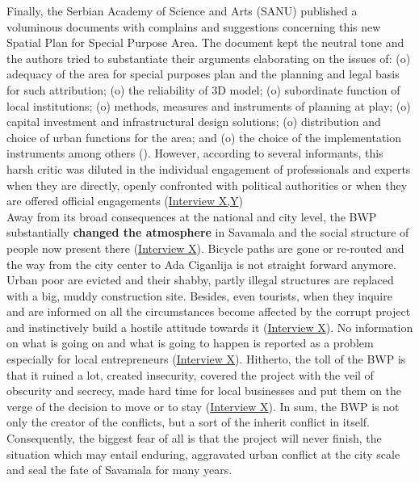 \documentclass[11pt]{report}
\begin{document}
Finally, the Serbian Academy of Science and Arts (SANU) published a voluminous documents with complains and suggestions concerning this new Spatial Plan for Special Purpose Area.
The document kept the neutral tone and the authors tried to substantiate their arguments elaborating on the issues of:
(o) adequacy of the area for special purposes plan and the planning and legal basis for such attribution;
(o) the reliability of 3D model;
(o) subordinate function of local institutions;
(o) methods, measures and instruments of planning at play;
(o) capital investment and infrastructural design solutions;
(o) distribution and choice of urban functions for the area;
and
(o) the choice of the implementation instruments among others (\citealt{sanu_nacrt_2014}).
However, according to several informants, this harsh critic was diluted in the individual engagement of professionals and experts when they are directly, openly confronted with political authorities or when they are offered official engagements
(\href{InterviewX}{Interview X,Y})
\\

Away from its broad consequences at the national and city level, the BWP substantially \textbf{changed the atmosphere} in Savamala and the social structure of people now present there
(\href{InterviewX}{Interview X}).
Bicycle paths are gone or re-routed and the way from the city center to Ada Ciganlija is not straight forward anymore.
Urban poor are evicted and their shabby, partly illegal structures are replaced with a big, muddy construction site.
Besides, even tourists, when they inquire and are informed on all the circumstances become affected by the corrupt project and instinctively build a hostile attitude towards it
(\href{InterviewX}{Interview X}).
No information on what is going on and what is going to happen is reported as a problem especially for local entrepreneurs
(\href{InterviewX}{Interview X}).
Hitherto, the toll of the BWP is that it ruined a lot, created insecurity, covered the project with the veil of obscurity and secrecy, made hard time for local businesses and put them on the verge of the decision to move or to stay
(\href{InterviewX}{Interview X}).
In sum, the BWP is not only the creator of the conflicts, but a sort of the inherit conflict in itself.
Consequently, the biggest fear of all is that the project will never finish, the situation which may entail enduring, aggravated urban conflict at the city scale and seal the fate of Savamala for many years.
\end{document}
